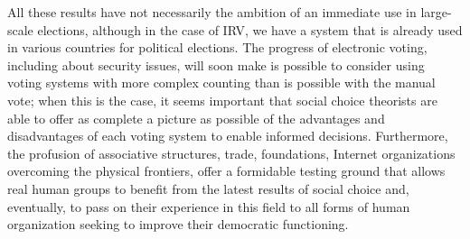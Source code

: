 \medskip
All these results have not necessarily the ambition of an immediate use in large-scale elections, although in the case of IRV, we have a system that is already used in various countries for political elections. The progress of electronic voting, including about security issues, will soon make is possible to consider using voting systems with more complex counting than is possible with the manual vote; when this is the case, it seems important that social choice theorists are able to offer as complete a picture as possible of the advantages and disadvantages of each voting system to enable informed decisions. Furthermore, the profusion of associative structures, trade, foundations, Internet organizations overcoming the physical frontiers, offer a formidable testing ground that allows real human groups to benefit from the latest results of social choice and, eventually, to pass on their experience in this field to all forms of human organization seeking to improve their democratic functioning.










